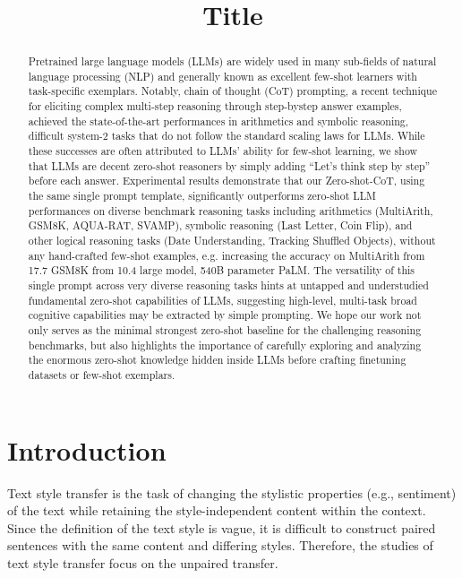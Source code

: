 \documentclass{article}
\title{Title}
\begin{document}
\maketitle

\begin{abstract}
  Pretrained large language models (LLMs) are widely used in many sub-fields of
natural language processing (NLP) and generally known as excellent few-shot
learners with task-specific exemplars. Notably, chain of thought (CoT) prompting,
a recent technique for eliciting complex multi-step reasoning through step-bystep answer examples, achieved the state-of-the-art performances in arithmetics
and symbolic reasoning, difficult system-2 tasks that do not follow the standard
scaling laws for LLMs. While these successes are often attributed to LLMs’
ability for few-shot learning, we show that LLMs are decent zero-shot reasoners
by simply adding “Let’s think step by step” before each answer. Experimental
results demonstrate that our Zero-shot-CoT, using the same single prompt template,
significantly outperforms zero-shot LLM performances on diverse benchmark
reasoning tasks including arithmetics (MultiArith, GSM8K, AQUA-RAT, SVAMP),
symbolic reasoning (Last Letter, Coin Flip), and other logical reasoning tasks (Date
Understanding, Tracking Shuffled Objects), without any hand-crafted few-shot
examples, e.g. increasing the accuracy on MultiArith from 17.7%
GSM8K from 10.4%
large model, 540B parameter PaLM. The versatility of this single prompt across
very diverse reasoning tasks hints at untapped and understudied fundamental
zero-shot capabilities of LLMs, suggesting high-level, multi-task broad cognitive
capabilities may be extracted by simple prompting. We hope our work not only
serves as the minimal strongest zero-shot baseline for the challenging reasoning
benchmarks, but also highlights the importance of carefully exploring and analyzing
the enormous zero-shot knowledge hidden inside LLMs before crafting finetuning
datasets or few-shot exemplars.
\end{abstract}

\section{Introduction}
Text style transfer is the task of changing the stylistic properties (e.g., sentiment) of the text while retaining the style-independent content within the context. Since the definition of the text style is vague, it is difficult to construct paired sentences with the same content and differing styles. Therefore, the studies of text style transfer focus on the unpaired transfer.
\end{document}
